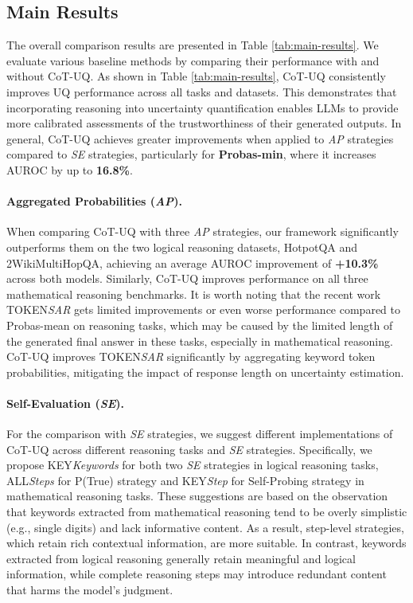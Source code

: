 \documentclass[11pt]{article}
\begin{document}
\subsection{Main Results}
\label{sec:exp:main}
The overall comparison results are presented in Table \ref{tab:main-results}. We evaluate various baseline methods by comparing their performance with and without CoT-UQ.  
As shown in Table \ref{tab:main-results}, CoT-UQ consistently improves UQ performance across all tasks and datasets. This demonstrates that incorporating reasoning into uncertainty quantification enables LLMs to provide more calibrated assessments of the trustworthiness of their generated outputs. 
In general, CoT-UQ achieves greater improvements when applied to \textit{AP} strategies compared to \textit{SE} strategies, particularly for \textbf{Probas-min}, where it increases AUROC by up to \textbf{16.8\%}.

\paragraph{Aggregated Probabilities (\textit{AP}).}
When comparing CoT-UQ with three \textit{AP} strategies, our framework significantly outperforms them on the two logical reasoning datasets, HotpotQA and 2WikiMultiHopQA, achieving an average AUROC improvement of \textbf{+10.3\%} across both models.
Similarly, CoT-UQ improves performance on all three mathematical reasoning benchmarks.
It is worth noting that the recent work {\small TOKEN}\textit{SAR} gets limited improvements or even worse performance compared to Probas-mean on reasoning tasks, which may be caused by the limited length of the generated final answer in these tasks, especially in mathematical reasoning. CoT-UQ improves {\small TOKEN}\textit{SAR} significantly by aggregating keyword token probabilities, mitigating the impact of response length on uncertainty estimation.

\paragraph{Self-Evaluation (\textit{SE}).}
For the comparison with \textit{SE} strategies, we suggest different implementations of CoT-UQ across different reasoning tasks and \textit{SE} strategies. Specifically, we propose {\small KEY}\textit{Keywords} for both two \textit{SE} strategies in logical reasoning tasks, {\small ALL}\textit{Steps} for P(True) strategy and {\small KEY}\textit{Step} for Self-Probing strategy in mathematical reasoning tasks. 
These suggestions are based on the observation that keywords extracted from mathematical reasoning tend to be overly simplistic (e.g., single digits) and lack informative content. As a result, step-level strategies, which retain rich contextual information, are more suitable. In contrast, keywords extracted from logical reasoning generally retain meaningful and logical information, while complete reasoning steps may introduce redundant content that harms the model's judgment.
\end{document}
